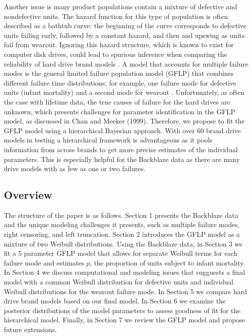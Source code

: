 \documentclass[12pt]{article}
\begin{document}
Another issue is many product populations contain a mixture of defective and nondefective units.  The hazard function for this type of population is often described as a bathtub curve: the beginning of the curve corresponds to defective units failing early, followed by a constant hazard, and then and upswing as units fail from wearout.  Ignoring this hazard structure, which is known to exist for computer disk drives, could lead to spurious inference when comparing the reliability of hard drive brand models \cite{chan}.  A model that accounts for multiple failure modes is the general limited failure population model (GFLP) that combines different failure time distributions; for example, one failure mode for defective units (infant mortality) and a second mode for wearout \cite{chan}.  Unfortunately, as often the case with lifetime data, the true causes of failure for the hard drives are unknown, which presents challenges for parameter identification in the GFLP model, as discussed in Chan and Meeker (1999).  Therefore, we propose to fit the GFLP model using a hierarchical Bayesian approach.  With over 60 brand drive models in testing a hierarchical framework is advantageous as it pools information from across brands to get more precise estimates of the individual parameters.  This is especially helpful for the Backblaze data as there are many drive models with as few as one or two failures.

\subsection{Overview}
The structure of the paper is as follows.  Section 1 presents the Backblaze data and the unique modeling challenges it presents, such as multiple failure modes, right censoring, and left truncation.  Section 2 introduces the GFLP model as a mixture of two Weibull distributions.  Using the Backblaze data, in Section 3 we fit a 5 parameter GFLP model that allows for separate Weibull terms for each failure mode and estimates $p$, the proportion of units subject to infant mortality.  In Section 4 we discuss computational and modeling issues that sugguests a final model with a common Weibull distribution for defective units and individual Weibull distributions for the wearout failure mode.  In Section 5 we compare hard drive brand models based on our final model.  In Section 6  we examine the posterior distributions of the model parameters to assess goodness of fit for the hierarchical model.  Finally, in Section 7 we review the GFLP model and propose future extensions.
\end{document}

